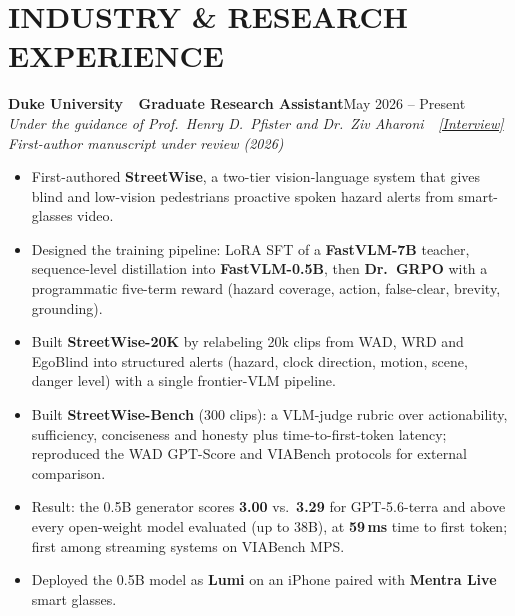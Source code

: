 \documentclass[11pt,letterpaper]{article}
\newcommand{\entry}[4]{%
  \noindent\textbf{\color{ink}#1}\hfill{\color{soft}\small #3}\\[1pt]%
  \textit{\color{muted}#2}\hfill\textit{\color{soft}\small #4}%
  \vspace{2pt}%
}
\begin{document}
\section{INDUSTRY \& RESEARCH EXPERIENCE}

\entry{Duke University \,\textemdash\, Graduate Research Assistant}{Under the guidance of Prof.\ Henry D.\ Pfister and Dr.\ Ziv Aharoni \,\textbar\, \href{https://www.youtube.com/watch?v=A2kWoNUxzRc&t=81s}{[Interview]}}{May 2026 -- Present}{}\\[1pt]
{\small\color{accent}\itshape First-author manuscript under review (2026)}
\begin{itemize}
  \item First-authored \textbf{StreetWise}, a two-tier vision-language system that gives blind and low-vision pedestrians proactive spoken hazard alerts from smart-glasses video.
  \item Designed the training pipeline: LoRA SFT of a \textbf{FastVLM-7B} teacher, sequence-level distillation into \textbf{FastVLM-0.5B}, then \textbf{Dr.~GRPO} with a programmatic five-term reward (hazard coverage, action, false-clear, brevity, grounding).
  \item Built \textbf{StreetWise-20K} by relabeling 20k clips from WAD, WRD and EgoBlind into structured alerts (hazard, clock direction, motion, scene, danger level) with a single frontier-VLM pipeline.
  \item Built \textbf{StreetWise-Bench} (300 clips): a VLM-judge rubric over actionability, sufficiency, conciseness and honesty plus time-to-first-token latency; reproduced the WAD GPT-Score and VIABench protocols for external comparison.
  \item Result: the 0.5B generator scores \textbf{3.00} vs.\ \textbf{3.29} for GPT-5.6-terra and above every open-weight model evaluated (up to 38B), at \textbf{59\,ms} time to first token; first among streaming systems on VIABench MPS.
  \item Deployed the 0.5B model as \textbf{Lumi} on an iPhone paired with \textbf{Mentra Live} smart glasses.
\end{itemize}
\end{document}
